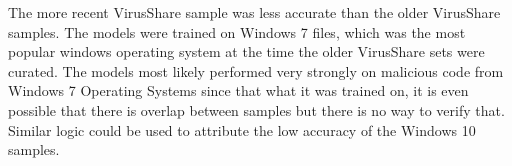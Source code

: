 The more recent VirusShare sample was less accurate than the older VirusShare samples.
The models were trained on Windows 7 files\cite{lester}, which was the most popular windows operating system at the
time the older VirusShare sets were curated\cite{statcounter}.
The models most likely performed very strongly on malicious code from Windows 7 Operating Systems since that what
it was trained on, it is even possible that there is overlap between samples but there is no way to verify that.
Similar logic could be used to attribute the low accuracy of the Windows 10 samples.

